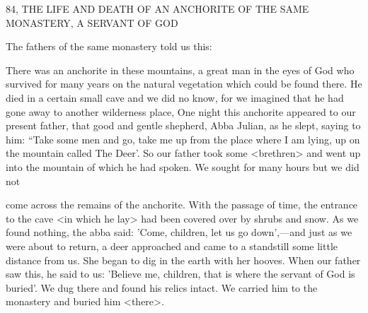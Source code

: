 84, THE LIFE AND DEATH OF AN ANCHORITE
OF THE SAME MONASTERY, A SERVANT OF GOD

The fathers of the same monastery told us this:

There was an anchorite in these mountains, a great man in the eyes
of God who survived for many years on the natural vegetation
which could be found there.
He died in a certain small cave and we
did no know, for we imagined that he had gone away to another
wilderness place, One night this anchorite appeared to our present
father, that good and gentle shepherd, Abba Julian, as he slept,
saying to him: “Take some men and go, take me up from the place
where I am lying, up on the mountain called The Deer'.
So our
father took some <brethren> and went up into the mountain of
which he had spoken.
We sought for many hours but we did not

come across the remains of the anchorite.
With the passage of time,
the entrance to the cave <in which he lay> had been covered over
by shrubs and snow.
As we found nothing, the abba said: 'Come,
children, let us go down',—and just as we were about to return, a
deer approached and came to a standstill some little distance from
us.
She began to dig in the earth with her hooves.
When our father
saw this, he said to us: 'Believe me, children, that is where the
servant of God is buried'.
We dug there and found his relics intact.
We carried him to the monastery and buried him <there>.

